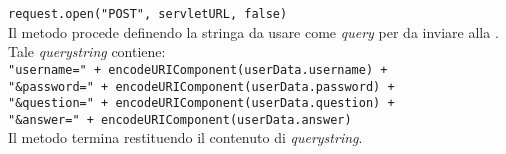 \begin{description}
	\verb|request.open("POST", servletURL, false)|\\
	
	Il metodo procede definendo la stringa da usare come \textit{query} per da inviare alla . Tale \textit{querystring} contiene:\\
	
	\verb|"username=" + encodeURIComponent(userData.username) +|\\
	\verb|"&password=" + encodeURIComponent(userData.password) +|\\
	\verb|"&question=" + encodeURIComponent(userData.question) +|\\
	\verb|"&answer=" + encodeURIComponent(userData.answer)|\\
	
	Il metodo termina restituendo il contenuto di \textit{querystring}.
	

\end{description}
